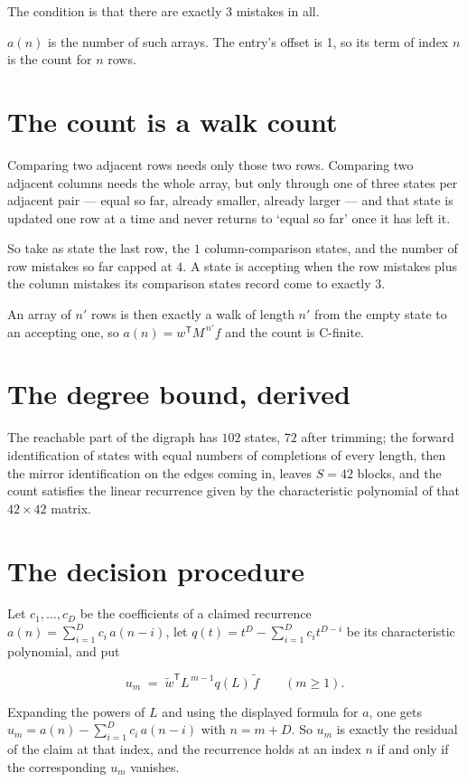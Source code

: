\documentclass[11pt]{article}
\theoremstyle{definition}
\begin{document}
The condition is that there are exactly $3$ mistakes in all.

$a(n)$ is the number of such arrays. The entry's offset is 1, so its term of index $n$ is the count for $n$ rows.

\section{The count is a walk count}

Comparing two adjacent rows needs only those two rows. Comparing two adjacent columns needs the whole array, but only through one of three states per adjacent pair --- equal so far, already smaller, already larger --- and that state is updated one row at a time and never returns to `equal so far' once it has left it.

So take as state the last row, the $1$ column-comparison states, and the number of row mistakes so far capped at $4$. A state is accepting when the row mistakes plus the column mistakes its comparison states record come to exactly $3$.

An array of $n'$ rows is then exactly a walk of length $n'$ from the empty state to an accepting one, so $a(n) = w^{\mathsf T}M^{\,n'}f$ and the count is C-finite.

\section{The degree bound, derived}

The reachable part of the digraph has $102$ states, $72$ after trimming; the forward identification of states with equal numbers of completions of every length, then the mirror identification on the edges coming in, leaves $S = 42$ blocks, and the count satisfies the linear recurrence given by the characteristic polynomial of that $42\times42$ matrix.

\section{The decision procedure}

Let $c_1,\dots,c_D$ be the coefficients of a claimed recurrence $a(n) = \sum_{i=1}^{D} c_i\,a(n-i)$, let $q(t) = t^{D} - \sum_{i=1}^{D} c_i t^{D-i}$ be its characteristic polynomial, and put

\[u_m \;=\; \tilde w^{\mathsf T} L^{\,m-1} q(L)\,\tilde f \qquad (m \ge 1).\]

Expanding the powers of $L$ and using the displayed formula for $a$, one gets $u_m = a(n) - \sum_{i=1}^{D} c_i\,a(n-i)$ with $n = m + D$. So $u_m$ is exactly the residual of the claim at that index, and the recurrence holds at an index $n$ if and only if the corresponding $u_m$ vanishes.
\end{document}
